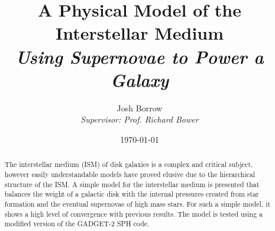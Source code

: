 
\begin{titlepage}

\thispagestyle{empty}

\author{Josh Borrow\\
\emph{Supervisor: Prof. Richard Bower}}
\date{\today}
    \title{A Physical Model of the Interstellar Medium\\
\vspace{4mm}
\large \emph{Using Supernovae to Power a Galaxy}}
\maketitle

\vspace{10mm}
\begin{abstract}
The interstellar medium (ISM) of disk galaxies is a complex and critical subject, however easily understandable models have proved elusive due to the hierarchical structure of the ISM. A simple model for the interstellar medium is presented that balances the weight of a galactic disk with the internal pressures created from star formation and the eventual supernovae of high mass stars. For such a simple model, it shows a high level of convergence with previous results. The model is tested using a modified version of the GADGET-2 SPH code.
\end{abstract}

\end{titlepage}

\newpage

